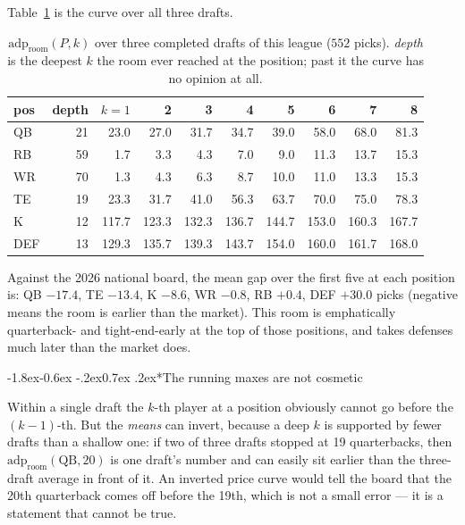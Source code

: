 \documentclass[10pt,a4paper]{article}
\makeatletter
\theoremstyle{plain}
\theoremstyle{definition}
\theoremstyle{remark}
\newcommand{\adp}{\mathrm{adp}}
\renewcommand\subsubsection{\@startsection{subsubsection}{3}{\z@}%
  {-1.8ex\@plus -0.6ex \@minus -.2ex}{0.7ex \@plus .2ex}{\normalfont\normalsize\bfseries}}
\makeatother
\begin{document}
Table~\ref{tab:roomcurve} is the curve over all three drafts.

\begin{table}[htbp]
\centering
\small
\begin{tabular}{lrrrrrrrrr}
\toprule
pos & depth & $k{=}1$ & 2 & 3 & 4 & 5 & 6 & 7 & 8 \\
\midrule
QB  & 21 & 23.0 & 27.0 & 31.7 & 34.7 & 39.0 & 58.0 & 68.0 & 81.3 \\
RB  & 59 & 1.7 & 3.3 & 4.3 & 7.0 & 9.0 & 11.3 & 13.7 & 15.3 \\
WR  & 70 & 1.3 & 4.3 & 6.3 & 8.7 & 10.0 & 11.0 & 13.3 & 15.3 \\
TE  & 19 & 23.3 & 31.7 & 41.0 & 56.3 & 63.7 & 70.0 & 75.0 & 78.3 \\
K   & 12 & 117.7 & 123.3 & 132.3 & 136.7 & 144.7 & 153.0 & 160.3 & 167.7 \\
DEF & 13 & 129.3 & 135.7 & 139.3 & 143.7 & 154.0 & 160.0 & 161.7 & 168.0 \\
\bottomrule
\end{tabular}
\caption{$\adp_{\text{room}}(P,k)$ over three completed drafts of this league
($552$ picks). \emph{depth} is the deepest $k$ the room ever reached at the position;
past it the curve has no opinion at all.}
\label{tab:roomcurve}
\end{table}

Against the 2026 national board, the mean gap over the first five at each position is:
QB $-17.4$, TE $-13.4$, K $-8.6$, WR $-0.8$, RB $+0.4$, DEF $+30.0$ picks (negative
means the room is earlier than the market). This room is emphatically quarterback- and
tight-end-early at the top of those positions, and takes defenses much later than the
market does.

\subsubsection*{The running maxes are not cosmetic}
\label{sec:roommono}

Within a single draft the $k$-th player at a position obviously cannot go before the
$(k{-}1)$-th. But the \emph{means} can invert, because a deep $k$ is supported by fewer
drafts than a shallow one: if two of three drafts stopped at 19 quarterbacks, then
$\adp_{\text{room}}(\text{QB}, 20)$ is one draft's number and can easily sit earlier
than the three-draft average in front of it. An inverted price curve would tell the
board that the 20th quarterback comes off before the 19th, which is not a small error
--- it is a statement that cannot be true.
\end{document}

